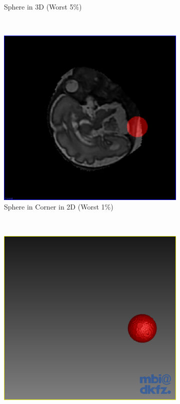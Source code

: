 \begin{figure}[H]
\begin{subfigure}[b]{0.5\textwidth}
    \caption{Sphere in 3D (Worst 5$\%$)}
    \label{fig:thresholdingresultssphere3d}
  \end{subfigure}
  ~ %
  \begin{subfigure}[b]{0.5\textwidth}
    \includegraphics[width=\textwidth]{images/thresholding/results/sphere_corner_2d.png}
    \caption{Sphere in Corner in 2D (Worst 1$\%$)}
    \label{fig:thresholdingresultsspherecorner2d}
  \end{subfigure}%
  ~ %
  \begin{subfigure}[b]{0.5\textwidth}
    \includegraphics[width=\textwidth]{images/thresholding/results/sphere_corner_3d.png}

\end{subfigure}
\end{figure}
